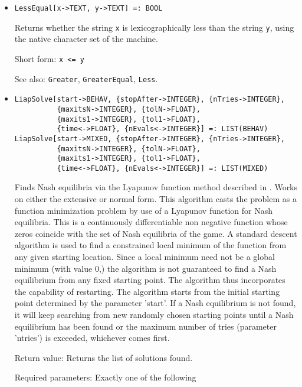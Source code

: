 \begin{itemize}
\item
\protect \large \begin{verbatim}
LessEqual[x->TEXT, y->TEXT] =: BOOL
\end{verbatim}\normalsize

\bd
Returns whether the string \verb+x+ is lexicographically less than
the string \verb+y+, using the native character set of the machine.
\item
[Short form:] \verb+x <= y+
\item
[See also:] {\tt Greater}, {\tt GreaterEqual}, {\tt Less}.
\ed

\item
\protect \large \begin{verbatim}
LiapSolve[start->BEHAV, {stopAfter->INTEGER}, {nTries->INTEGER},
          {maxitsN->INTEGER}, {tolN->FLOAT},
          {maxits1->INTEGER}, {tol1->FLOAT},
          {time<->FLOAT}, {nEvals<->INTEGER}] =: LIST(BEHAV)
LiapSolve[start->MIXED, {stopAfter->INTEGER}, {nTries->INTEGER},
          {maxitsN->INTEGER}, {tolN->FLOAT},
          {maxits1->INTEGER}, {tol1->FLOAT},
          {time<->FLOAT}, {nEvals<->INTEGER}] =: LIST(MIXED)
\end{verbatim}\normalsize


\bd
\item
[] Finds Nash equilibria via the Lyapunov function method
described in \cite[1991]{McK:91}.  Works on either the
extensive or normal form.  This algorithm casts the problem as a
function minimization problem by use of a Lyapunov function for Nash
equilibria.  This is a continuously differentiable non negative
function whose zeros coincide with the set of Nash equilibria of the
game.  A standard descent algorithm is used to find a constrained
local minimum of the function from any given starting location.  Since
a local minimum need not be a global minimum (with value 0,) the
algorithm is not guaranteed to find a Nash equilibrium from any fixed
starting point.  The algorithm thus incorporates the capability of
restarting.  The algorithm starts from the initial starting point
determined by the parameter 'start'.  If a Nash equilibrium is not
found, it will keep searching from new randomly chosen starting points
until a Nash equilibrium has been found or the maximum number of tries
(parameter 'ntries') is exceeded, whichever comes first.
\item
[Return value:] Returns the list of solutions found.
\item
[Required parameters:] Exactly one of the following \hfil\null


\end{itemize}
